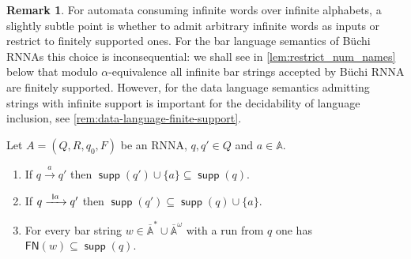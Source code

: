 \documentclass[final,a4paper,UKenglish,thm-restate,autoref,numberwithinsect]{lipics-v2021}
\newcommand{\resetCurThmBraces}{%
\gdef\curThmBraceOpen{(}%
\gdef\curThmBraceClose{)}}
\newcommand{\removeThmBraces}{%
\gdef\curThmBraceOpen{}%
\gdef\curThmBraceClose{}}
\newenvironment{notheorembrackets}{\removeThmBraces}{\resetCurThmBraces}
\newcommand{\scriptmidmid}{\hspace{0.2ex}{\rule[-0.1ex]{0.6pt}{1.1ex}}\hspace{0.2ex}}
\newcommand{\scriptnew}[1]{{\scriptmidmid}#1}
\newcommand{\FN}{\mathsf{FN}}
\newcommand{\barA}{\overline{\names}}
\numberwithin{equation}{section}
\newcommand{\xto}[1]{\xrightarrow{~#1~}}
\newcommand{\seq}{\subseteq}
\newcommand{\+}[1]{\mathcal{#1}\xspace}
\newcommand{\names}{\mathbb{A}}
\DeclareMathOperator{\supp}{\mathsf{supp}} %
\theoremstyle{definition}
\newtheorem{rem}[theorem]{Remark}
\begin{document}
\begin{rem}
  For automata consuming infinite words over infinite alphabets, a slightly subtle point is whether to admit arbitrary infinite words
  as inputs or restrict to finitely supported ones. For the bar language semantics of Büchi RNNAs this choice is inconsequential: we shall see in
  \autoref{lem:restrict_num_names} below that modulo
  $\alpha$-equivalence all infinite bar strings accepted by Büchi RNNA
  are finitely supported. However, for the data language semantics admitting strings with infinite support is important for the decidability of language inclusion, see \autoref{rem:data-language-finite-support}.
\end{rem}
%
\begin{notheorembrackets}
  \begin{lemma}\label{lem:rnna-props}
    Let $A=(Q,R,q_0,F)$ be an RNNA, $q,q'\in Q$ and $a\in \names$.
    \begin{enumerate}
    \item\label{lem:rnna-props:1} If $q\xto{a} q'$ then $\supp(q')\cup \{a\}\seq \supp(q)$.
    \item\label{lem:rnna-props:2} If $q\xto{\scriptnew a} q'$ then $\supp(q')\seq \supp(q)\cup \{a\}$. 
    \item\label{lem:rnna-props:3} For every bar string $w\in \barA^*\cup \barA^\omega$ with a run from $q$ one has $\FN(w)\seq \supp(q)$.
    \end{enumerate}
  \end{lemma}
\end{notheorembrackets}
\end{document}
